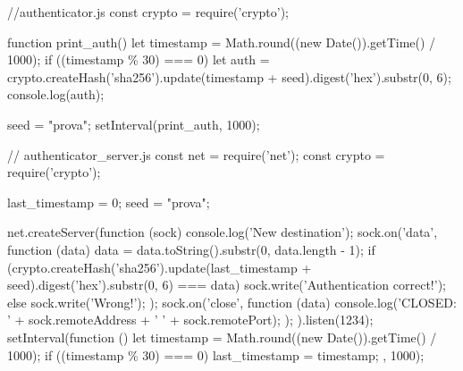 \begin{Answer}[ref={authenticator}]
  
  \begin{js}
    //authenticator.js
    const crypto = require('crypto');
    
    function print_auth() {
      let timestamp = Math.round((new Date()).getTime() / 1000);
      if ((timestamp \% 30) === 0) {
        let auth = crypto.createHash('sha256').update(timestamp + seed).digest('hex').substr(0, 6);
        console.log(auth);
      }
    }
    
    seed = "prova";
    setInterval(print_auth, 1000);
  \end{js}
  
  
  \begin{js}
    // authenticator\_server.js
    const net = require('net');
    const crypto = require('crypto');
    
    last_timestamp = 0;
    seed = "prova";
    
    net.createServer(function (sock) {
      console.log('New destination');
      sock.on('data', function (data) {
        data = data.toString().substr(0, data.length - 1);
        if (crypto.createHash('sha256').update(last_timestamp + seed).digest('hex').substr(0, 6) === data) {
          sock.write('Authentication correct!\n');
        }
        else {
          sock.write('Wrong!\n');
        }
      });
      sock.on('close', function (data) {
        console.log('CLOSED: ' + sock.remoteAddress + ' ' + sock.remotePort);
      });
    }).listen(1234);
    setInterval(function () {
      let timestamp = Math.round((new Date()).getTime() / 1000);
      if ((timestamp \% 30) === 0) {
        last_timestamp = timestamp;
      }
    }, 1000);
  \end{js}
\end{Answer}